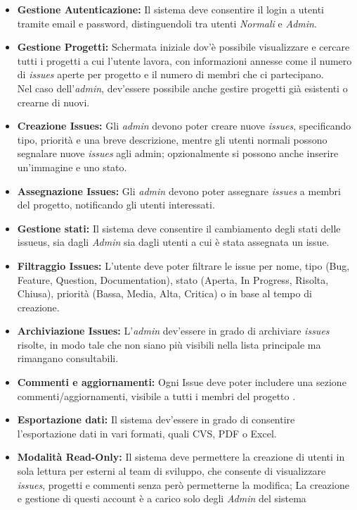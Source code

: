 \begin{itemize} %
	
	\item \textbf{Gestione Autenticazione:} Il sistema deve consentire il login a utenti tramite email e password, distinguendoli tra utenti \textit{Normali} e \textit{Admin}.
	
	\item \textbf{Gestione Progetti:} Schermata iniziale dov'è possibile visualizzare e cercare tutti i progetti a cui l'utente lavora, con informazioni annesse come il numero di \textit{issues} aperte per progetto e il numero di membri che ci partecipano.\\
	Nel caso dell'\textit{admin}, dev'essere possibile anche gestire progetti già esistenti o crearne di nuovi.
	
	
	\item \textbf{Creazione Issues:} Gli \textit{admin} devono poter creare nuove \textit{issues}, specificando tipo, priorità e una breve descrizione, mentre gli utenti normali possono segnalare nuove \textit{issues} agli admin; opzionalmente si possono anche inserire un'immagine e uno stato.
	
	\item \textbf{Assegnazione Issues:} Gli \textit{admin} devono poter assegnare \textit{issues} a membri del progetto, notificando gli utenti interessati.
	
	\item \textbf{Gestione stati:} Il sistema deve consentire il cambiamento degli stati delle issueus, sia dagli \textit{Admin} sia dagli utenti a cui è stata assegnata un issue.
	
	\item \textbf{Filtraggio Issues:} L’utente deve poter filtrare le issue per nome, tipo (Bug, Feature, Question, Documentation), stato (Aperta, In Progress, Risolta, Chiusa), priorità (Bassa, Media, Alta, Critica) o in base al tempo di creazione.
	
	\item \textbf{Archiviazione Issues:} L'\textit{admin} dev'essere in grado di archiviare \textit{issues} risolte, in modo tale che non siano più visibili nella lista principale ma rimangano consultabili.
	
	\item \textbf{Commenti e aggiornamenti:} Ogni Issue deve poter includere una sezione commenti/aggiornamenti, visibile a tutti i membri del progetto .
	
	\item \textbf{Esportazione dati:} Il sistema dev'essere in grado di consentire l'esportazione dati in vari formati, quali CVS, PDF o Excel.
	
	\item \textbf{Modalità Read-Only:} Il sistema deve permettere la creazione di utenti in sola lettura per esterni al team di sviluppo, che consente di visualizzare \textit{issues}, progetti e commenti senza però permetterne la modifica; La creazione e gestione di questi account è a carico solo degli \textit{Admin} del sistema 
	
\end{itemize}

